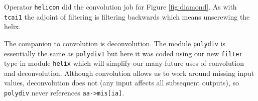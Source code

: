 \par
Operator {\tt helicon} did the convolution job for Figure \ref{fig:diamond}.
As with
\texttt{tcai1} 
the adjoint of filtering is filtering backwards
which means unscrewing the helix.

\par
The companion to convolution is deconvolution.
The module \texttt{polydiv} 
is essentially the same as
\texttt{polydiv1} 
but here it was coded using
our new \texttt{filter} type in
module \texttt{helix} 
which will simplify our many future uses of
convolution and deconvolution.
Although convolution allows us to work around missing input values,
deconvolution does not
(any input affects all subsequent outputs),
so \texttt{polydiv} never references \verb#aa->mis[ia]#.



